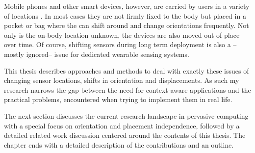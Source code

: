 Mobile phones and other smart devices, however, are carried by users in a variety of locations \cite{Ichikawa:2005p6295}. 
In most cases they are not firmly fixed to the body but placed in a pocket or bag where the can shift
around and change orientations frequently. Not only is the on-body location unknown, the devices are also moved out of place over time. 
Of course, shifting sensors during long term deployment is also a -- mostly ignored-- issue for dedicated wearable sensing systems.

This thesis describes approaches and methods to deal with exactly these issues of changing sensor locations, shifts in orientation and displacements.
As such my research narrows the gap between the need for context-aware applications and the practical problems, encountered when trying to implement them in real life. 

The next section discusses the current research landscape in pervasive computing with a special focus on orientation and placement independence, followed by a detailed related work discussion centered around the contents of this thesis. The chapter ends with a detailed description of the contributions and an outline.


